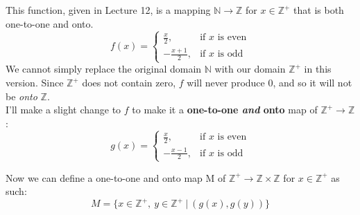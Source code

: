 \documentclass{article}
\begin{document}
\section{}
This function, given in Lecture 12, is a mapping $\mathbb{N} \rightarrow \mathbb{Z}$ for $x \in \mathbb{Z}^+$ that is both one-to-one and onto.
\begin{equation*}
    f(x) =\begin{cases}
        \frac{x}{2},& \text{if $x$ is even}\\
        -\frac{x+1}{2},& \text{if $x$ is odd}
    \end{cases}
\end{equation*}
We cannot simply replace the original domain $\mathbb{N}$ with our domain $\mathbb{Z}^+$ in this version. Since $\mathbb{Z}^+$ does not contain zero, $f$ will never produce 0, and so it will not be \emph{onto} $\mathbb{Z}$.\\
I'll make a slight change to $f$ to make it a \textbf{one-to-one \emph{and} onto} map of $\mathbb{Z}^+ \rightarrow \mathbb{Z}$:
\begin{equation*}
    g(x) =\begin{cases}
        \frac{x}{2},& \text{if $x$ is even}\\
        -\frac{x-1}{2},& \text{if $x$ is odd}
    \end{cases}
\end{equation*}

Now we can define a one-to-one and onto map M of $\mathbb{Z}^+ \rightarrow \mathbb{Z} \times \mathbb{Z} $ for $x \in \mathbb{Z}^+$ as such:
\begin{equation*}
    M = \{ x \in \mathbb{Z}^+,\ y \in \mathbb{Z}^+  \ | \ (g(x), g(y)) \}
\end{equation*}
\end{document}
